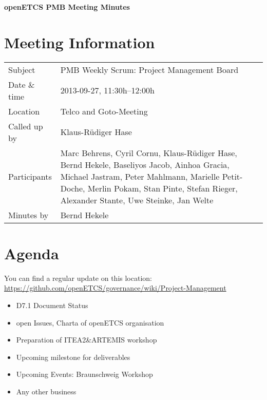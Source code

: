 \documentclass[a4paper, 11pt]{article}
\begin{document}
{\begin{center}\huge\bf openETCS PMB Meeting Minutes\end{center}}
\section{Meeting Information}

\renewcommand{\arraystretch}{1.5}
\begin{supertabular}{m{.2\textwidth}m{.8\textwidth}}
Subject & PMB Weekly Scrum: Project Management Board\\
Date \& time & 2013-09-27, 11:30h--12:00h\\
Location & Telco and Goto-Meeting\\
Called up by & Klaus-R\"udiger Hase\\
Participants &
Marc Behrens,
Cyril Cornu,
Klaus-R\"udiger Hase,
Bernd Hekele,
Baseliyos Jacob,
Ainhoa Gracia,
Michael Jastram,
Peter Mahlmann,
Marielle Petit-Doche,
Merlin Pokam,
Stan Pinte,
Stefan Rieger,
Alexander Stante,
Uwe Steinke,
Jan Welte
\\

Minutes by & Bernd Hekele\\

\end{supertabular}
\renewcommand{\arraystretch}{1.0}


\section{{Agenda}}
You can find a regular update on this location: \url{https://github.com/openETCS/governance/wiki/Project-Management}

\begin{itemize}
\item D7.1 Document Status
\item open Issues, Charta of openETCS organisation
\item Preparation of ITEA2\&ARTEMIS workshop
\item Upcoming milestone for deliverables 
\item Upcoming Events: Braunschweig Workshop
\item Any other business
\end{itemize}
\end{document}
